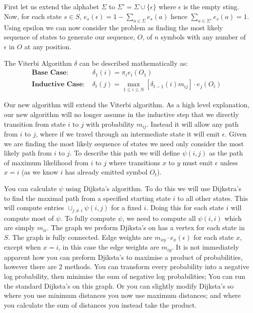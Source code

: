 \subsection{}
First let us extend the alphabet $\Sigma$ to $\Sigma' = \Sigma \cup \{\epsilon\}$ where $\epsilon$ is the empty sting. Now, for each state $s\in S$, $e_s(\epsilon) = 1 - \sum_{a\in \Sigma} e_s(a)$ hence $\sum_{a\in \Sigma'} e_s(a) = 1$. Using epsilon we can now consider the problem as finding the most likely sequence of states to generate our sequence, $O$, of $n$ symbols with any number of $\epsilon$ in $O$ at any position.

The Viterbi Algorithm $\delta$ can be described mathematically as:
\begin{align*}
\textbf{Base Case: } &\delta_1(i) = \pi_i e_i(O_1)\\
\textbf{Inductive Case: } &\delta_t(j) = \max_{1\leq i \leq N}[\delta_{t-1}(i)m_{ij}]\cdot e_j(O_t)
\end{align*}

Our new algorithm will extend the Viterbi algorithm. As a high level explanation, our new algorithm will no longer assume in the inductive step that we directly transition from state $i$ to $j$ with probability $m_{ij}$. 
Instead it will allow any path from $i$ to $j$, where if we travel through an intermediate state it will emit $\epsilon$.
Given we are finding the most likely sequence of states we need only consider the most likely path from $i$ to $j$. 
To describe this path we will define $\psi(i,j)$ as the path of maximum likelihood from $i$ to $j$ where transitions $x$ to $y$ must emit $\epsilon$ unless $x=i$ (as we know $i$ has already emitted symbol $O_t$).

You can calculate $\psi$ using Dijksta's algorithm. To do this we will use Dijkstra's to find the maximal path from a specified starting state $i$ to all other states. 
This will compute entries $\cup_{j \neq i} \psi(i,j)$ for a fixed $i$. Doing this for each state $i$ will compute most of $\psi$. To fully compute $\psi$, we need to compute all $\psi(i,i)$ which are simply $m_{ii}$.
The graph we preform Djiksta's on has a vertex for each state in $S$. 
The graph is fully connected. 
Edge weights are $m_{xy}\cdot e_x(\epsilon)$ for each state $x$, except when $x=i$, in this case the edge weights are $m_{iy}$.
It is not immediately apparent how you can preform Djiksta's to maximise a product of probabilities, however there are 2 methods.
You can transform every probability into a negative log probability, then minimise the sum of negative log probabilities; You can run the standard Dijksta's on this graph. 
Or you can slightly modify Dijksta's so where you use minimum distances you now use maximum distances; and where you calculate the sum of distances you instead take the product.


